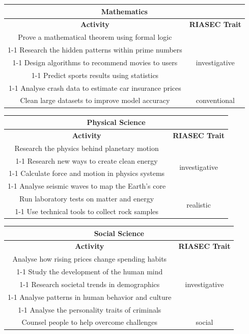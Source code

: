 \begin{table}[H]
\centering
\begin{tabular}{|c|c|}
\hline
\multicolumn{2}{|c|}{\textbf{Mathematics}}\\
\hline
\hline
\textbf{Activity} & \textbf{RIASEC Trait}\\
\hline
Prove a mathematical theorem using formal logic & \multirow{5}{*}{investigative}\\
\cline{1-1}
Research the hidden patterns within prime numbers & \\
\cline{1-1}
Design algorithms to recommend movies to users & \\
\cline{1-1}
Predict sports results using statistics & \\
\cline{1-1}
Analyse crash data to estimate car insurance prices & \\
\hline
Clean large datasets to improve model accuracy & conventional\\
\hline
\end{tabular}
\end{table}

\begin{table}[H]
\centering
\begin{tabular}{|c|c|}
\hline
\multicolumn{2}{|c|}{\textbf{Physical Science}}\\
\hline
\hline
\textbf{Activity} & \textbf{RIASEC Trait}\\
\hline
Research the physics behind planetary motion & \multirow{4}{*}{investigative}\\
\cline{1-1}
Research new ways to create clean energy & \\
\cline{1-1}
Calculate force and motion in physics systems & \\
\cline{1-1}
Analyse seismic waves to map the Earth's core & \\
\hline
Run laboratory tests on matter and energy & \multirow{2}{*}{realistic}\\
\cline{1-1}
Use technical tools to collect rock samples & \\
\hline
\end{tabular}
\end{table}

\begin{table}[H]
\centering
\begin{tabular}{|c|c|}
\hline
\multicolumn{2}{|c|}{\textbf{Social Science}}\\
\hline
\hline
\textbf{Activity} & \textbf{RIASEC Trait}\\
\hline
Analyse how rising prices change spending habits & \multirow{5}{*}{investigative}\\
\cline{1-1}
Study the development of the human mind & \\
\cline{1-1}
Research societal trends in demographics & \\
\cline{1-1}
Analyse patterns in human behavior and culture & \\
\cline{1-1}
Analyse the personality traits of criminals & \\
\hline
Counsel people to help overcome challenges & social\\
\hline
\end{tabular}
\end{table}


